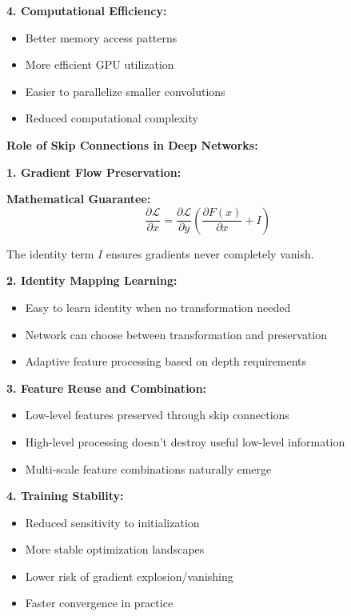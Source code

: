 \documentclass[12pt]{article}
\begin{document}
\begin{enumerate}[(a)]
{    \textbf{4. Computational Efficiency:}
    \begin{itemize}
        \item Better memory access patterns
        \item More efficient GPU utilization
        \item Easier to parallelize smaller convolutions
        \item Reduced computational complexity
    \end{itemize}
    
    \textbf{Role of Skip Connections in Deep Networks:}
    
    \textbf{1. Gradient Flow Preservation:}
    
    \textbf{Mathematical Guarantee:}
    $$\frac{\partial \mathcal{L}}{\partial x} = \frac{\partial \mathcal{L}}{\partial y}\left(\frac{\partial F(x)}{\partial x} + I\right)$$
    
    The identity term $I$ ensures gradients never completely vanish.
    
    \textbf{2. Identity Mapping Learning:}
    \begin{itemize}
        \item Easy to learn identity when no transformation needed
        \item Network can choose between transformation and preservation
        \item Adaptive feature processing based on depth requirements
    \end{itemize}
    
    \textbf{3. Feature Reuse and Combination:}
    \begin{itemize}
        \item Low-level features preserved through skip connections
        \item High-level processing doesn't destroy useful low-level information
        \item Multi-scale feature combinations naturally emerge
    \end{itemize}
    
    \textbf{4. Training Stability:}
    \begin{itemize}
        \item Reduced sensitivity to initialization
        \item More stable optimization landscapes
        \item Lower risk of gradient explosion/vanishing
        \item Faster convergence in practice
    \end{itemize}
    
}
\end{enumerate}
\end{document}
